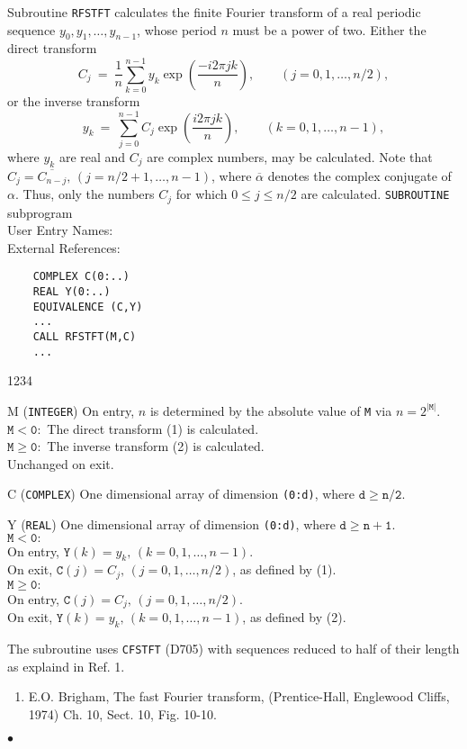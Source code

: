                                  
  
\Submitter{}                                    
Subroutine {\tt RFSTFT} calculates the finite Fourier transform of a
real periodic sequence $y_0,y_1,\ldots,y_{n-1}$, whose period $n$ must
be a power of two. Either the direct transform
\begin{equation}
C_j \ = \ \frac{1}{n}
\sum_{k=0}^{n-1}y_k \exp \left( \frac{-i 2\pi jk}{n} \right),
\qquad (j=0,1,\ldots,n/2),
\end{equation}
or the inverse transform
\begin{equation}
y_k \ = \ \sum_{j=0}^{n-1} C_j \exp \left( \frac{i 2\pi jk}{n} \right),
\qquad (k=0,1,\ldots,n-1),
\end{equation}
where $y_k$ are real and $C_j$ are complex numbers, may be calculated.
Note that $C_j=\overline{C_{n-j}},\,(j=n/2+1,\ldots,n-1)$, where
$\overline{\alpha}$ denotes the complex conjugate of $\alpha$.
Thus, only the numbers $C_j$ for which $0 \le j \le n/2$ are
calculated.
\Structure
{\tt SUBROUTINE} subprogram \\
User Entry Names:  \\
External References: 
\Usage
\begin{verbatim}
    COMPLEX C(0:..)
    REAL Y(0:..)
    EQUIVALENCE (C,Y)
    ...
    CALL RFSTFT(M,C)
    ...
\end{verbatim}
\begin{DLtt}{1234}
\item[M] ({\tt INTEGER}) On entry, $n$ is determined by the absolute
value of {\tt M} via $n=2^{\mathtt{|M|}}$. \\
$\mathtt{M<0:}$ The direct transform (1) is calculated. \\
$\mathtt{M \ge 0:}$ The inverse transform (2) is calculated. \\
Unchanged on exit.
\item[C] ({\tt COMPLEX}) One dimensional array of dimension {\tt (0:d)},
where $\mathtt{d \ge n/2}$.
\item[Y] ({\tt REAL}) One dimensional array of dimension {\tt (0:d)},
where $\mathtt{d \ge n+1}$. \\
$\mathtt{M<0:}$ \\
On entry, $\mathtt{Y}(k)=y_k,\,(k=0,1,\ldots,n-1)$.\\
On exit, $\mathtt{C}(j)=C_j,\,(j=0,1,\ldots,n/2)$,
as defined by (1). \\
$\mathtt{M \ge 0:}$ \\
On entry, $\mathtt{C}(j)=C_j,\,(j=0,1,\ldots,n/2)$. \\
On exit, $\mathtt{Y}(k)=y_k,\,(k=0,1,\ldots,n-1)$,
as defined by (2).
\end{DLtt}
\newpage
\Method
The subroutine uses {\tt CFSTFT} (D705) with sequences reduced to
half of their length as explaind in Ref. 1.
\Refer
\begin{enumerate}
\item  E.O. Brigham, The fast Fourier transform,
(Prentice-Hall, Englewood Cliffs, 1974) Ch. 10, Sect. 10, Fig. 10-10.
\end{enumerate}
$\bullet$
